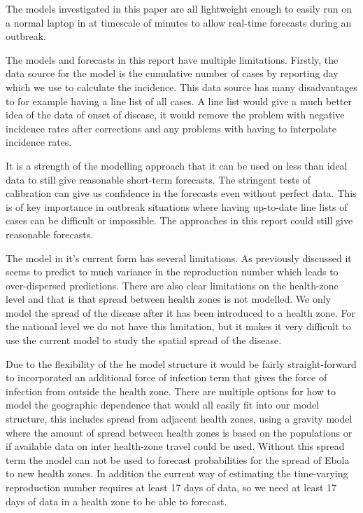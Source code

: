 \documentclass[12pt]{article}
\begin{document}
The models investigated in this paper are all lightweight enough to easily run on a normal laptop in at timescale of minutes to allow real-time forecasts during an outbreak. 



The models and forecasts in this report have multiple limitations. Firstly, the data source for the model is the cumulative number of cases by reporting day which we use to calculate the incidence. This data source has many disadvantages to for example having a line list of all cases. A line list would give a much better idea of the data of onset of disease, it would remove the problem with negative incidence rates after corrections and any problems with having to interpolate incidence rates.

It is a strength of the modelling approach that it can be used on less than ideal data to still give reasonable short-term forecasts. The stringent tests of calibration can give us confidence in the forecasts even without perfect data. This is of key importance in outbreak situations where having up-to-date line lists of cases can be difficult or impossible. The approaches in this report could still give reasonable forecasts. 

The model in it's current form has several limitations. As previously discussed it seems to predict to much variance in the reproduction number which leads to over-dispersed predictions. There are also clear limitations on the health-zone level and that is that spread between health zones is not modelled. We only model the spread of the disease after it has been introduced to a health zone. For the national level we do not have this limitation, but it makes it very difficult to use the current model to study the spatial spread of the disease. 

Due to the flexibility of the he model structure it would be fairly straight-forward to incorporated an additional force of infection term that gives the force of infection from outside the health zone. There are multiple options for how to model the geographic dependence that would all easily fit into our model structure, this includes spread from adjacent health zones, using a gravity model where the amount of spread between health zones is based on the populations or if available data on inter health-zone travel could be used. Without this spread term the model can not be used to forecast probabilities for the spread of Ebola to new health zones. In addition the current way of estimating the time-varying reproduction number requires at least 17 days of data, so we need at least 17 days of data in a health zone to be able to forecast.
\end{document}
